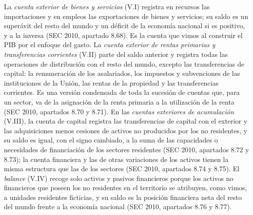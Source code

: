\documentclass[10pt,a4paper]{article}
\begin{document}
{    La \textit{cuenta exterior de bienes y servicios} (V.I) registra en recursos las importaciones y en empleos las exportaciones de bienes y servicios; su saldo es un superávit del resto del mundo y un déficit de la economía nacional si es positivo, y a la inversa (SEC 2010, apartado 8.68). Es la cuenta que vimos al construir el PIB por el enfoque del gasto. La \textit{cuenta exterior de rentas primarias y transferencias corrientes} (V.II) parte del saldo anterior y registra todas las operaciones de distribución con el resto del mundo, excepto las transferencias de capital: la remuneración de los asalariados, los impuestos y subvenciones de las instituciones de la Unión, las rentas de la propiedad y las transferencias corrientes. Es una versión condensada de toda la sucesión de cuentas que, para un sector, va de la asignación de la renta primaria a la utilización de la renta (SEC 2010, apartados 8.70 y 8.71). En las \textit{cuentas exteriores de acumulación} (V.III), la cuenta de capital registra las transferencias de capital con el exterior y las adquisiciones menos cesiones de activos no producidos por los no residentes, y su saldo es igual, con el signo cambiado, a la suma de las capacidades o necesidades de financiación de los sectores residentes (SEC 2010, apartados 8.72 y 8.73); la cuenta financiera y las de otras variaciones de los activos tienen la misma estructura que las de los sectores (SEC 2010, apartados 8.74 y 8.75). El \textit{balance} (V.IV) recoge solo activos y pasivos financieros porque los activos no financieros que poseen los no residentes en el territorio se atribuyen, como vimos, a unidades residentes ficticias, y su saldo es la posición financiera neta del resto del mundo frente a la economía nacional (SEC 2010, apartados 8.76 y 8.77).
}
\end{document}
